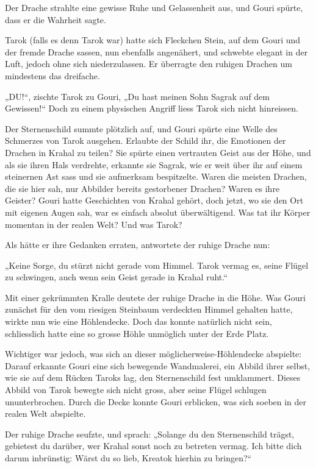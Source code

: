 Der Drache strahlte eine gewisse Ruhe und Gelassenheit aus, und Gouri spürte, dass er die Wahrheit sagte.

Tarok (falls es denn Tarok war) hatte sich Fleckchen Stein, auf dem Gouri und der fremde Drache sassen, nun ebenfalls angenähert, und schwebte elegant in der Luft, jedoch ohne sich niederzulassen. Er überragte den ruhigen Drachen um mindestens das dreifache.

„DU!“, zischte Tarok zu Gouri, „Du hast meinen Sohn Sagrak auf dem Gewissen!“ Doch zu einem physischen Angriff liess Tarok sich nicht hinreissen.

Der Sternenschild summte plötzlich auf, und Gouri spürte eine Welle des Schmerzes von Tarok ausgehen. Erlaubte der Schild ihr, die Emotionen der Drachen in Krahal zu teilen? Sie spürte einen vertrauten Geist aus der Höhe, und als sie ihren Hals verdrehte, erkannte sie Sagrak, wie er weit über ihr auf einem steinernen Ast sass und sie aufmerksam bespitzelte. Waren die meisten Drachen, die sie hier sah, nur Abbilder bereits gestorbener Drachen? Waren es ihre Geister? Gouri hatte Geschichten von Krahal gehört, doch jetzt, wo sie den Ort mit eigenen Augen sah, war es einfach absolut überwältigend. Was tat ihr Körper momentan in der realen Welt? Und was Tarok?

Als hätte er ihre Gedanken erraten, antwortete der ruhige Drache nun:

„Keine Sorge, du stürzt nicht gerade vom Himmel. Tarok vermag es, seine Flügel zu schwingen, auch wenn sein Geist gerade in Krahal ruht.“

Mit einer gekrümmten Kralle deutete der ruhige Drache in die Höhe. Was Gouri zunächst für den vom riesigen Steinbaum verdeckten Himmel gehalten hatte, wirkte nun wie eine Höhlendecke. Doch das konnte natürlich nicht sein, schliesslich hatte eine so grosse Höhle unmöglich unter der Erde Platz.

Wichtiger war jedoch, was sich an dieser möglicherweise-Höhlendecke abspielte: Darauf erkannte Gouri eine sich bewegende Wandmalerei, ein Abbild ihrer selbst, wie sie auf dem Rücken Taroks lag, den Sternenschild fest umklammert. Dieses Abbild von Tarok bewegte sich nicht gross, aber seine Flügel schlugen ununterbrochen. Durch die Decke konnte Gouri erblicken, was sich soeben in der realen Welt abspielte.

Der ruhige Drache seufzte, und sprach: „Solange du den Sternenschild trägst, gebietest du darüber, wer Krahal sonst noch zu betreten vermag. Ich bitte dich darum inbrünstig: Wärst du so lieb, Kreatok hierhin zu bringen?“

